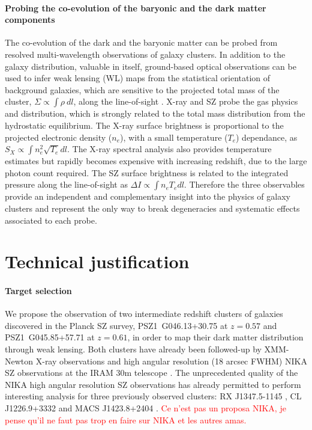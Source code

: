 \documentclass[11pt,a4paper,twoside,graphicx,color]{article}
\begin{document}
\paragraph{\large Probing the co-evolution of the baryonic and the dark matter components}
The co-evolution of the dark and the baryonic matter can be probed from resolved multi-wavelength observations of galaxy clusters. In addition to the galaxy distribution, valuable in itself, ground-based optical observations can be used to infer weak lensing (WL) maps from the statistical orientation of background galaxies, which are sensitive to the projected total mass of the cluster, $\Sigma \propto \int \rho \ dl$, along the line-of-sight \citep[see][for a review]{hoekstra2013}. X-ray and SZ probe the gas physics and distribution, which is strongly related to the total mass distribution from the hydrostatic equilibrium. The X-ray surface brightness is proportional to the projected electronic density ($n_e$), with a small temperature ($T_e$) dependance, as $S_X \propto \int n_e^2 \sqrt{T_e} dl$. The X-ray spectral analysis also provides temperature estimates but rapidly becomes expensive with increasing redshift, due to the large photon count required. The SZ surface brightness is related to the integrated pressure along the line-of-sight as $\Delta I \propto \int n_e T_e dl$. Therefore the three observables provide an independent and complementary insight into the physics of galaxy clusters and represent the only way to break degeneracies and systematic effects associated to each probe.

\section{Technical justification}
\paragraph{\large Target selection}
We propose the observation of two intermediate redshift clusters of galaxies discovered in the Planck SZ survey, PSZ1~G046.13+30.75 at $z=0.57$ and PSZ1~G045.85+57.71 at $z=0.61$, in order to map their dark matter distribution through weak lensing. Both clusters have already been followed-up by XMM-Newton X-ray observations and high angular resolution (18 arcsec FWHM) NIKA SZ observations at the IRAM 30m telescope \citep{monfardini2010, monfardini2011, calvo2013, catalano2014}. The unprecedented quality of the NIKA high angular resolution SZ observations has already permitted to perform interesting analysis for three previously observed clusters: RX J1347.5-1145 \citep[at z=0.45, ][]{adam2014}, CL J1226.9+3332 \citep[at z=0.89, ][]{adam2015} and MACS J1423.8+2404 \citep[z=0.54, ][]{adamprep}.
\textcolor{red}{Ce n'est pas un proposa NIKA, je pense qu'il ne faut pas trop en faire sur NIKA et les autres amas.}
\end{document}
